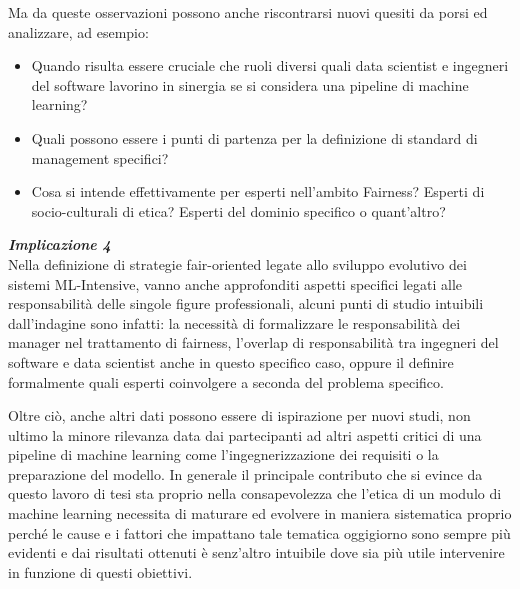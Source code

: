     Ma da queste osservazioni possono anche riscontrarsi nuovi quesiti da porsi ed analizzare, ad esempio:
    
    \begin{itemize}
        \item Quando risulta essere cruciale che ruoli diversi quali data scientist e ingegneri del software lavorino in sinergia se si considera una pipeline di machine learning?
        \item Quali possono essere i punti di partenza per la definizione di standard di management specifici?
        \item Cosa si intende effettivamente per esperti nell'ambito Fairness? Esperti di socio-culturali di etica? Esperti del dominio specifico o quant'altro?
    \end{itemize}
    
    \begin{center}
	
        \begin{tcolorbox}[width=\textwidth, colframe=black, colback=perla]
    			\begin{minipage}{\textwidth}
    				\textit{\faCaretSquareORight  \textbf{ Implicazione 4}}\\
    		   Nella definizione di strategie fair-oriented legate allo sviluppo evolutivo dei sistemi ML-Intensive, vanno anche approfonditi aspetti specifici legati alle responsabilità delle singole figure professionali, alcuni punti di studio intuibili dall'indagine sono infatti: la necessità di formalizzare le responsabilità dei manager nel trattamento di fairness, l'overlap di responsabilità tra ingegneri del software e data scientist anche in questo specifico caso, oppure il definire formalmente quali esperti coinvolgere a seconda del problema specifico.
    			\end{minipage}
		\end{tcolorbox}
	\end{center}
    Oltre ciò, anche altri dati possono essere di ispirazione per nuovi studi, non ultimo la minore rilevanza data dai partecipanti ad altri aspetti critici di una pipeline di machine learning come l'ingegnerizzazione dei requisiti o la preparazione del modello. In generale il principale contributo che si evince da questo lavoro di tesi sta proprio nella consapevolezza che l'etica di un modulo di machine learning necessita di maturare ed evolvere in maniera sistematica proprio perché le cause e i fattori che impattano tale tematica oggigiorno sono sempre più evidenti e dai risultati ottenuti è senz'altro intuibile dove sia più utile intervenire in funzione di questi obiettivi.
    
